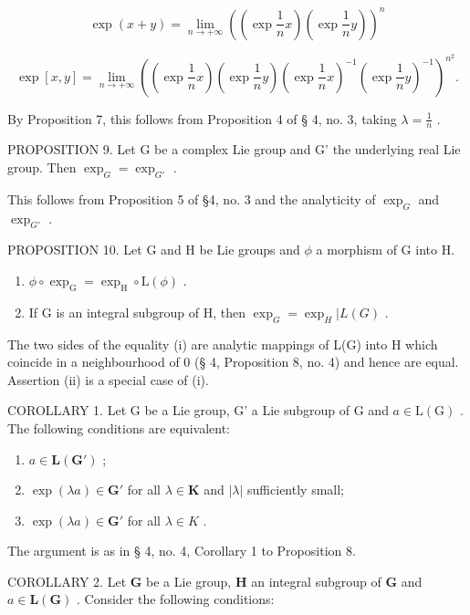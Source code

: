 \[
\exp (x + y) = \lim _ {n \rightarrow + \infty} \left(\left(\exp \frac {1}{n} x\right)\left(\exp \frac {1}{n} y\right)\right) ^ {n}\tag{2}
\]

\[
\exp [ x, y ] = \lim _ {n \rightarrow + \infty} \left(\left(\exp \frac {1}{n} x\right)\left(\exp \frac {1}{n} y\right)\left(\exp \frac {1}{n} x\right) ^ {- 1} \left(\exp \frac {1}{n} y\right) ^ {- 1}\right) ^ {n ^ {2}}\tag{3}.
\]

By Proposition 7, this follows from Proposition 4 of § 4, no. 3, taking \(\lambda = \frac{1}{n}\) .

PROPOSITION 9. Let G be a complex Lie group and G' the underlying real Lie group. Then \(\exp_{G} = \exp_{G'}\) .

This follows from Proposition 5 of §4, no. 3 and the analyticity of \(\exp_{G}\) and \(\exp_{G'}\) .

PROPOSITION 10. Let G and H be Lie groups and \(\phi\) a morphism of G into H.

\begin{enumerate}
\def\labelenumi{(\roman{enumi})}
\item
  \(\phi \circ \exp_{\mathrm{G}} = \exp_{\mathrm{H}} \circ \mathrm{L}(\phi)\) .
\item
  If G is an integral subgroup of H, then \(\exp_{G} = \exp_{H} | L(G)\) .
\end{enumerate}

The two sides of the equality (i) are analytic mappings of L(G) into H which coincide in a neighbourhood of 0 (§ 4, Proposition 8, no. 4) and hence are equal. Assertion (ii) is a special case of (i).

COROLLARY 1. Let G be a Lie group, G' a Lie subgroup of G and \(a \in \mathrm{L}(\mathrm{G})\) . The following conditions are equivalent:

\begin{enumerate}
\def\labelenumi{(\roman{enumi})}
\item
  \(a \in \mathbf{L}(\mathbf{G}')\) ;
\item
  \(\exp (\lambda a)\in \mathbf{G}'\) for all \(\lambda \in \mathbf{K}\) and \(|\lambda |\) sufficiently small;
\item
  \(\exp(\lambda a) \in \mathbf{G}'\) for all \(\lambda \in K\) .
\end{enumerate}

The argument is as in § 4, no. 4, Corollary 1 to Proposition 8.

COROLLARY 2. Let \(\mathbf{G}\) be a Lie group, \(\mathbf{H}\) an integral subgroup of \(\mathbf{G}\) and \(a \in \mathbf{L}(\mathbf{G})\) . Consider the following conditions:

